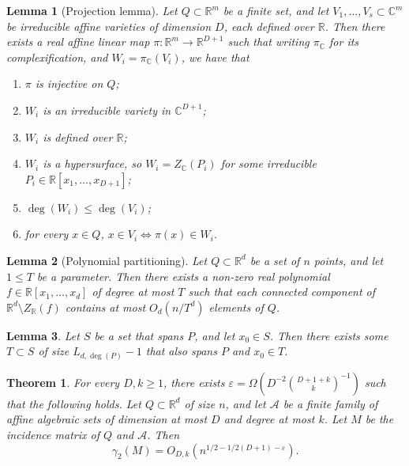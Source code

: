 \documentclass[10pt,a4paper]{amsart}
\newtheorem{lemma}{Lemma}
\newtheorem{theorem}{Theorem}
\newcommand{\eps}{\varepsilon}
\begin{document}
	\begin{lemma}[Projection lemma]\label{lemma:projection}
		Let $Q\subset \mathbb{R}^m$ be a finite set, and let $V_1,\dots,V_s\subset \mathbb{C}^m$ be irreducible affine varieties of dimension $D$, each defined over $\mathbb{R}$. Then there exists a real affine linear map $\pi:\mathbb{R}^m\rightarrow \mathbb{R}^{D+1}$ such that writing $\pi_{\mathbb{C}}$ for its complexification, and $W_i=\pi_{\mathbb{C}}(V_i)$, we have that
		\begin{enumerate}
			\item $\pi$ is injective on $Q$;
			\item $W_i$ is an irreducible variety in $\mathbb{C}^{D+1}$;
			\item $W_i$ is defined over $\mathbb{R}$;
			\item $W_i$ is a hypersurface, so $W_i=Z_{\mathbb{C}}(P_i)$ for some irreducible $P_i\in \mathbb{R}[x_1,\dots,x_{D+1}]$;
			\item $\deg(W_i)\leq \deg(V_i)$;
			\item for every $x\in Q$, $x\in V_i \iff \pi(x)\in W_i$.
		\end{enumerate}
	\end{lemma}

	\begin{lemma}[Polynomial partitioning]\label{lemma:poly_partition}
		Let $Q\subset \mathbb{R}^d$ be a set of $n$ points, and let $1\leq T$ be a parameter. Then there exists a non-zero real polynomial $f\in \mathbb{R}[x_1,\dots,x_d]$ of degree at most $T$ such that each connected component of $\mathbb{R}^d\setminus Z_{\mathbb{R}}(f)$ contains at most $O_d(n/T^d)$ elements of $Q$.
	\end{lemma}

	\begin{lemma}\label{lemma:spanning}
		Let $S$ be a set that spans $P$, and let $x_0\in S$. Then there exists some $T\subset S$ of size $L_{d,\deg(P)}-1$ that also spans $P$ and $x_0\in T$.
	\end{lemma}

	\begin{theorem}\label{thm:variety}
		For every $D,k\geq 1$, there exists $\eps=\Omega(D^{-2}\binom{D+1+k}{k}^{-1})$ such that the following holds. Let $Q\subset \mathbb{R}^{d}$ of size $n$, and let $\mathcal{A}$ be a finite family of affine algebraic sets of dimension at most $D$ and degree at most $k$. Let $M$ be the incidence matrix of $Q$ and $\mathcal{A}$. Then
		$$\gamma_2(M)=O_{D,k}(n^{1/2-1/2(D+1)-\eps}).$$
	\end{theorem}
\end{document}
